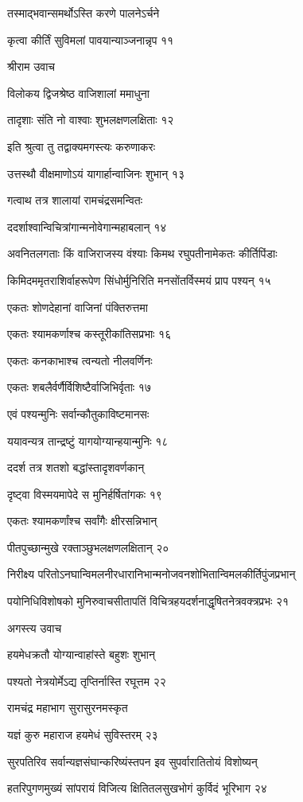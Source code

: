 तस्माद्भवान्समर्थोऽस्ति करणे पालनेऽर्चने

कृत्वा कीर्तिं सुविमलां पावयान्याञ्जनान्नृप ११

श्रीराम उवाच

विलोकय द्विजश्रेष्ठ वाजिशालां ममाधुना

तादृशाः संति नो वाश्वाः शुभलक्षणलक्षिताः १२

इति श्रुत्वा तु तद्वाक्यमगस्त्यः करुणाकरः

उत्तस्थौ वीक्षमाणोऽयं यागार्हान्वाजिनः शुभान् १३

गत्वाथ तत्र शालायां रामचंद्रसमन्वितः

ददर्शाश्वान्विचित्रांगान्मनोवेगान्महाबलान् १४

अवनितलगताः किं वाजिराजस्य वंश्याः किमथ रघुपतीनामेकतः कीर्तिपिंडाः

किमिदममृतराशिर्वाहरूपेण सिंधोर्मुनिरिति मनसोंतर्विस्मयं प्राप पश्यन् १५

एकतः शोणदेहानां वाजिनां पंक्तिरुत्तमा

एकतः श्यामकर्णाश्च कस्तूरीकांतिसप्रभाः १६

एकतः कनकाभाश्च त्वन्यतो नीलवर्णिनः

एकतः शबलैर्वर्णैर्विशिष्टैर्वाजिभिर्वृताः १७

एवं पश्यन्मुनिः सर्वान्कौतुकाविष्टमानसः

ययावन्यत्र तान्द्रष्टुं यागयोग्यान्हयान्मुनिः १८

ददर्श तत्र शतशो बद्धांस्तादृशवर्णकान्

दृष्ट्वा विस्मयमापेदे स मुनिर्हर्षितांगकः १९

एकतः श्यामकर्णांश्च सर्वांगैः क्षीरसन्निभान्

पीतपुच्छान्मुखे रक्ताञ्छुभलक्षणलक्षितान् २०

निरीक्ष्य परितोऽनघान्विमलनीरधारानिभान्मनोजवनशोभितान्विमलकीर्तिपुंजप्रभान्

पयोनिधिविशोषको मुनिरुवाचसीतापतिं विचित्रहयदर्शनाद्धृषितनेत्रवक्त्रप्रभः २१

अगस्त्य उवाच

हयमेधक्रतौ योग्यान्वाहांस्ते बहुशः शुभान्

पश्यतो नेत्रयोर्मेऽद्य तृप्तिर्नास्ति रघूत्तम २२

रामचंद्र महाभाग सुरासुरनमस्कृत

यज्ञं कुरु महाराज हयमेधं सुविस्तरम् २३

सुरपतिरिव सर्वान्यज्ञसंघान्करिष्यंस्तपन इव सुपर्वारातितोयं विशोष्यन्

हतरिपुगणमुख्यं सांपरायं विजित्य क्षितितलसुखभोगं कुर्विदं भूरिभाग २४

